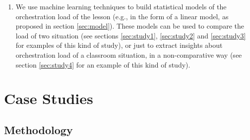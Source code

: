 \documentclass[10pt,journal,compsoc]{IEEEtran}
\begin{document}
\begin{enumerate}
\item We use machine learning techniques to build statistical models of the orchestration load of the lesson (e.g., in the form of a linear model, as proposed in section \ref{sec:model}). These models can be used to compare the load of two situation (see sections \ref{sec:study1}, \ref{sec:study2} and \ref{sec:study3} for examples of this kind of study), or just to extract insights about orchestration load of a classroom situation, in a non-comparative way (see section \ref{sec:study4} for an example of this kind of study).

\end{enumerate}




\section{Case Studies}
\label{sec:eval}

\subsection{Methodology}
\end{document}
